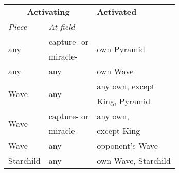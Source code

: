 \begin{table}[!h]
\centering
\begin{tabular}{ lll }
\toprule %
\multicolumn{2}{c}{ \textbf{Activating} }                               & \textbf{Activated}            \\
\cmidrule{1-2} %
\emph{Piece}                            & \emph{At field}               &                               \\
\midrule %
\multirow{2}{*}{any\footnotemark[1]}    & capture- or                   & \multirow{2}{*}{own Pyramid}  \\
                                        & miracle-                      &                               \\
\cmidrule{1-3} %
any\footnotemark[1]                     & any                           & own Wave                      \\
\cmidrule{1-3} %
\multirow{2}{*}{Wave}                   & \multirow{2}{*}{any}          & any own, except               \\
                                        &                               & King, Pyramid                 \\
\cmidrule{1-3} %
\multirow{2}{*}{Wave\footnotemark[2]}   & capture- or                   & any own,                      \\
                                        & miracle-                      & except King                   \\
\cmidrule{1-3} %
Wave                                    & any                           & opponent's Wave               \\
\cmidrule{1-3} %
Starchild                               & any                           & own Wave, Starchild           \\

\end{tabular}
\end{table}
